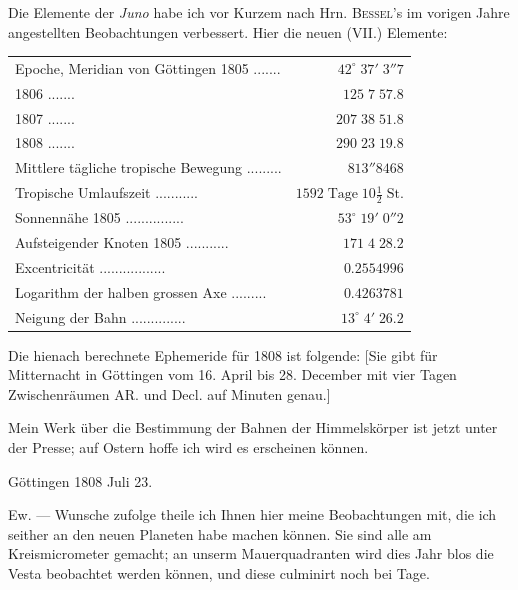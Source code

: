 \par\indent Die Elemente der \emph{Juno} habe ich vor Kurzem nach Hrn. \textsc{Bessel}'s im vorigen Jahre
angestellten Beobachtungen verbessert. Hier die neuen (VII.) Elemente:


\begin{center}\fontsize{10}{12}\selectfont\setlength{\tabcolsep}{3pt}\renewcommand{\arraystretch}{1.15}\begin{tabular}{lr}
Epoche, Meridian von Göttingen 1805 .\;.\;.\;.\;.\;.\;.\; & $42^\circ\;37'\;3''7$ \\
1806 .\;.\;.\;.\;.\;.\;.\; & $125\;7\;57.8$ \\
1807 .\;.\;.\;.\;.\;.\;.\; & $207\;38\;51.8$ \\
1808 .\;.\;.\;.\;.\;.\;.\; & $290\;23\;19.8$ \\
Mittlere tägliche tropische Bewegung .\;.\;.\;.\;.\;.\;.\;.\;.\; & $813''8468$ \\
Tropische Umlaufszeit .\;.\;.\;.\;.\;.\;.\;.\;.\;.\;.\; & $1592\;\text{Tage}\;10\tfrac12\;\text{St.}$ \\
Sonnennähe 1805 .\;.\;.\;.\;.\;.\;.\;.\;.\;.\;.\;.\;.\;.\;.\; & $53^\circ\;19'\;0''2$ \\
Aufsteigender Knoten 1805 .\;.\;.\;.\;.\;.\;.\;.\;.\;.\;.\; & $171\;4\;28.2$ \\
Excentricität .\;.\;.\;.\;.\;.\;.\;.\;.\;.\;.\;.\;.\;.\;.\;.\;.\; & $0.2554996$ \\
Logarithm der halben grossen Axe .\;.\;.\;.\;.\;.\;.\;.\;.\; & $0.4263781$ \\
Neigung der Bahn .\;.\;.\;.\;.\;.\;.\;.\;.\;.\;.\;.\;.\;.\; & $13^\circ\;4'\;26.2$ \\
\end{tabular}\end{center}


\par\indent Die hienach berechnete Ephemeride für 1808 ist folgende: [Sie gibt für Mitternacht in
Göttingen vom 16. April bis 28. December mit vier Tagen Zwischenräumen AR. und Decl. auf
Minuten genau.]

\par\indent Mein Werk über die Bestimmung der Bahnen der Himmelskörper ist jetzt unter der Presse; auf
Ostern hoffe ich wird es erscheinen können.

\begin{flushright}
Göttingen 1808 Juli 23.
\end{flushright}

\par\indent Ew. --- Wunsche zufolge theile ich Ihnen hier meine Beobachtungen mit, die ich seither an
den neuen Planeten habe machen können. Sie sind alle am Kreismicrometer gemacht; an unserm
Mauerquadranten wird dies Jahr blos die Vesta beobachtet werden können, und diese culminirt
noch bei Tage.

